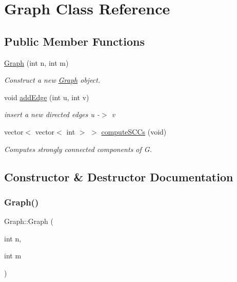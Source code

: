 \hypertarget{classGraph}{}\section{Graph Class Reference}
\label{classGraph}
\subsection*{Public Member Functions}
\begin{DoxyCompactItemize}
\item 
\mbox{\hyperlink{classGraph_a6373445ba46075e2a486cce2335b37e7}{Graph}} (int n, int m)
\begin{DoxyCompactList}\small\item\em Construct a new \mbox{\hyperlink{classGraph}{Graph}} object. \end{DoxyCompactList}\item 
void \mbox{\hyperlink{classGraph_ad8c10df34357b2cd865c81e0c4f0bd8c}{add\+Edge}} (int u, int v)
\begin{DoxyCompactList}\small\item\em insert a new directed edges u -\/$>$ v \end{DoxyCompactList}\item 
vector$<$ vector$<$ int $>$ $>$ \mbox{\hyperlink{classGraph_a35fd495e6f86b5323d15e2ed1cc4b692}{compute\+S\+C\+Cs}} (void)
\begin{DoxyCompactList}\small\item\em Computes strongly connected components of G. \end{DoxyCompactList}\end{DoxyCompactItemize}


\subsection{Constructor \& Destructor Documentation}
\mbox{\label{classGraph_a6373445ba46075e2a486cce2335b37e7}} 
\subsubsection{\texorpdfstring{Graph()}{Graph()}}
{\footnotesize\ttfamily Graph\+::\+Graph (\begin{DoxyParamCaption}\item[{int}]{n,  }\item[{int}]{m }\end{DoxyParamCaption})}



